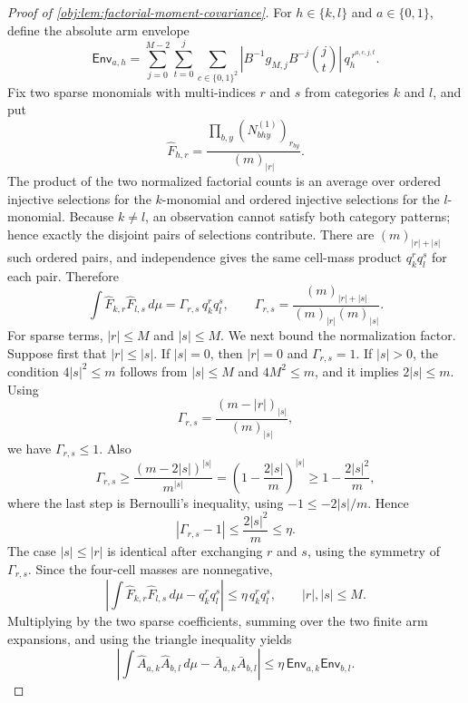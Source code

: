 \begin{proof}[Proof of \cref{obj:lem:factorial-moment-covariance}]
For \(h\in\{k,l\}\) and \(a\in\{0,1\}\), define the absolute arm envelope
\[
\mathsf{Env}_{a,h}
=
\sum_{j=0}^{M-2}\sum_{t=0}^{j}\sum_{c\in\{0,1\}^2}
\left|B^{-1}g_{M,j}B^{-j}\binom jt\right|\,q_h^{\,r^{a,c,j,t}}.
\]
Fix two sparse monomials with multi-indices \(r\) and \(s\) from categories \(k\) and
\(l\), and put
\[
\widehat F_{h,r}=\frac{\prod_{b,y}(N^{(1)}_{bhy})_{r_{by}}}{(m)_{|r|}}.
\]
The product of the two normalized factorial counts is an average over ordered injective
selections for the \(k\)-monomial and ordered injective selections for the \(l\)-monomial.
Because \(k\ne l\), an observation cannot satisfy both category patterns; hence exactly the
disjoint pairs of selections contribute.  There are \((m)_{|r|+|s|}\) such ordered pairs,
and independence gives the same cell-mass product \(q_k^r q_l^s\) for each pair.  Therefore
\[
\int \widehat F_{k,r}\widehat F_{l,s}\,d\mu
=
\Gamma_{r,s}\,q_k^rq_l^s,
\qquad
\Gamma_{r,s}
=
\frac{(m)_{|r|+|s|}}{(m)_{|r|}(m)_{|s|}}.
\]
For sparse terms, \(|r|\le M\) and \(|s|\le M\).  We next bound the normalization factor.  Suppose
first that \(|r|\le |s|\).  If \(|s|=0\), then \(|r|=0\) and \(\Gamma_{r,s}=1\).  If
\(|s|>0\), the condition \(4|s|^2\le m\) follows from \(|s|\le M\) and \(4M^2\le m\), and it
implies \(2|s|\le m\).  Using
\[
\Gamma_{r,s}
=\frac{(m-|r|)_{|s|}}{(m)_{|s|}},
\]
we have \(\Gamma_{r,s}\le1\).  Also
\[
\Gamma_{r,s}
\ge
\frac{(m-2|s|)^{|s|}}{m^{|s|}}
=\left(1-\frac{2|s|}{m}\right)^{|s|}
\ge
1-\frac{2|s|^2}{m},
\]
where the last step is Bernoulli's inequality, using \(-1\le -2|s|/m\).  Hence
\[
|\Gamma_{r,s}-1|\le \frac{2|s|^2}{m}\le\eta .
\]
The case \(|s|\le |r|\) is identical after exchanging \(r\) and \(s\), using the symmetry of
\(\Gamma_{r,s}\).  Since the four-cell masses are nonnegative,
\[
\left|
\int \widehat F_{k,r}\widehat F_{l,s}\,d\mu-q_k^rq_l^s
\right|
\le
\eta\,q_k^rq_l^s,
\qquad |r|,|s|\le M.
\]
Multiplying by the two sparse coefficients, summing over the two finite arm expansions, and
using the triangle inequality yields
\[
\left|
\int \widehat A_{a,k}\widehat A_{b,l}\,d\mu-
\bar A_{a,k}\bar A_{b,l}
\right|
\le
\eta\,\mathsf{Env}_{a,k}\mathsf{Env}_{b,l}.
\]


\end{proof}

